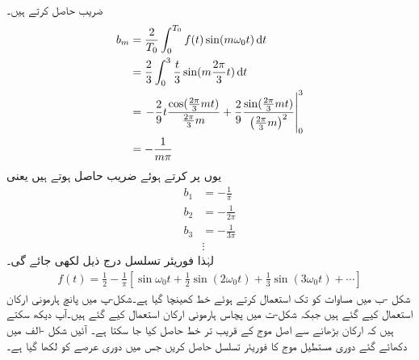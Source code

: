  ضریب   حاصل کرتے ہیں۔
\begin{align*}
b_m&=\frac{2}{T_0}\int_0^{T_0} f(t)\sin(m\omega_0 t) \dif t\\
&=\frac{2}{3}\int_0^3 \frac{t}{3}\sin (m\frac{2\pi}{3} t) \dif t\\
&=\left.-\frac{2}{9}t\frac{\cos(\frac{2\pi}{3}mt)}{\frac{2\pi}{3}m}+\frac{2}{9}\frac{\sin(\frac{2\pi}{3}mt)}{\left(\frac{2\pi}{3}m\right)^2}\right|_0^3\\
&=-\frac{1}{m\pi}
\end{align*}
یوں  پر کرتے ہوئے  ضریب  حاصل ہوتے ہیں یعنی
\begin{align*}
b_1&=-\frac{1}{\pi}\\
b_2&=-\frac{1}{2\pi}\\
b_3&=-\frac{1}{3\pi}\\
&\vdots
\end{align*}
لہٰذا فوریئر تسلسل درج ذیل لکھی جائے گی۔
\begin{align}\label{مساوات_فوریئر_دندان_موج}
f(t)=\frac{1}{2}-\frac{1}{\pi}\left[\sin \omega_0 t+\frac{1}{2} \sin (2\omega_0 t) +\frac{1}{3} \sin (3\omega_0 t)+\cdots\right]
\end{align}
شکل -ب میں  مساوات  کو  تک استعمال کرتے ہوئے خط کھینچا گیا ہے۔شکل-پ میں پانچ ہارمونی ارکان استعمال کیے گئے ہیں جبکہ شکل-ت میں پچاس ہارمونی ارکان استعمال کیے گئے ہیں۔آپ دیکھ سکتے ہیں کہ ارکان بڑھانے سے اصل موج کے قریب تر خط حاصل کیا جا سکتا ہے۔
آئیں شکل -الف  میں دکھائے گئے  دوری مستطیل موج کا فوریئر تسلسل حاصل کریں جس میں دوری عرصے کو  لکھا گیا ہے۔
